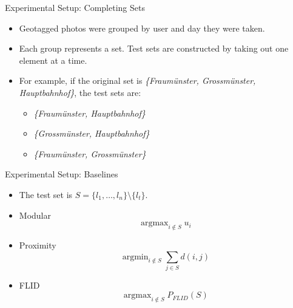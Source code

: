 \documentclass{beamer}
\DeclareMathOperator*{\argmin}{argmin}
\DeclareMathOperator*{\argmax}{argmax}
\begin{document}
\begin{frame}{Experimental Setup: Completing Sets}
  \begin{itemize}
    \item Geotagged photos were grouped by user and day they were taken.
    \item Each group represents a set. Test sets are constructed by taking out one element at a time.
    \item For example, if the original set is \textit{\{Fraumünster, Grossmünster, Hauptbahnhof\}}, the test sets are:
      \begin{itemize}
        \item \textit{\{Fraumünster, Hauptbahnhof\}}
        \item \textit{\{Grossmünster, Hauptbahnhof\}}
        \item \textit{\{Fraumünster, Grossmünster\}}
      \end{itemize}
  \end{itemize}
\end{frame}

\begin{frame}{Experimental Setup: Baselines}
  \begin{itemize}
    \item The test set is $S = \{l_{1}, \dots, l_{n}\} \setminus \{l_{t}\}$.
    \item Modular
      \begin{equation*}
         \argmax_{i \notin S} u_{i}
      \end{equation*}
    \item Proximity
      \begin{equation*}
        \argmin_{i \notin S} \sum_{j \in S}d(i,j)
      \end{equation*}
    \item FLID
      \begin{equation*}
        \argmax_{i \notin S} P_{FLID}(S)
      \end{equation*}
  \end{itemize}
\end{frame}
\end{document}

